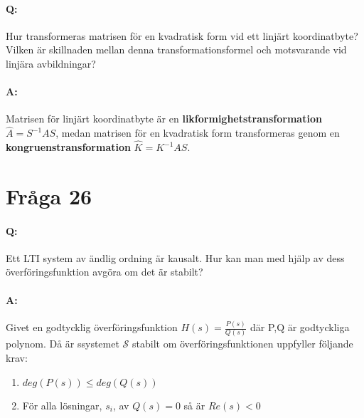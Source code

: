 \documentclass[a4paper]{article}
\begin{document}
\paragraph{Q:} Hur transformeras matrisen för en kvadratisk form vid ett linjärt koordinatbyte? Vilken är skillnaden mellan denna transformationsformel och motsvarande vid linjära avbildningar?
\paragraph{A:} Matrisen för linjärt koordinatbyte är en \textbf{likformighetstransformation}\\ {\center $\hat{A} = S^{-1}AS$,  \endcenter} medan matrisen för en kvadratisk form transformeras genom en \textbf{kongruenstransformation} {\center $\hat{K} = K^{-1}AS$. \endcenter }

\section{Fråga 26}
\paragraph{Q:} Ett LTI system av ändlig ordning är kausalt. Hur kan man med hjälp av dess överföringsfunktion avgöra om det är stabilt? 
\paragraph{A:} Givet en godtycklig överföringsfunktion { \center $ H(s) = \frac{P(s)}{Q(s)} $ där P,Q är godtyckliga polynom. \endcenter } Då är ssystemet $\mathcal{S}$ stabilt om överföringsfunktionen uppfyller följande krav:   
\begin{enumerate}[1)]
\item $deg(P(s)) \leq deg(Q(s))$ 
\item För alla lösningar, $s_i$, av $Q(s) = 0$ så är $Re(s) < 0$
\end{enumerate}
\end{document}
